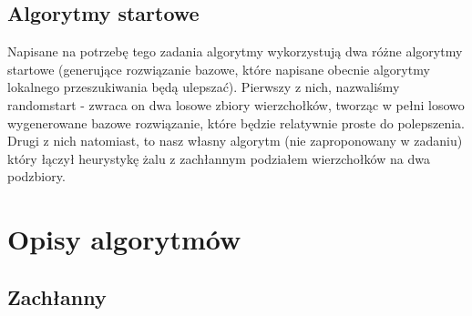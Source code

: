 \documentclass[11pt]{article}
\begin{document}
\subsection{Algorytmy startowe}\label{subsec:algorytmy-startowe}

Napisane na potrzebę tego zadania algorytmy wykorzystują dwa różne algorytmy startowe
(generujące rozwiązanie bazowe, które napisane obecnie algorytmy lokalnego przeszukiwania będą ulepszać).
Pierwszy z nich, nazwaliśmy randomstart - zwraca on dwa losowe zbiory wierzchołków, tworząc w pełni losowo wygenerowane bazowe rozwiązanie, które będzie relatywnie proste do polepszenia.
Drugi z nich natomiast, to nasz własny algorytm (nie zaproponowany w zadaniu) który łączył heurystykę żalu z zachłannym podziałem wierzchołków na dwa podzbiory.


\section{Opisy algorytmów}\label{sec:opisy-alg}

\subsection{Zachłanny}\label{subsec:zachanny}
\end{document}
